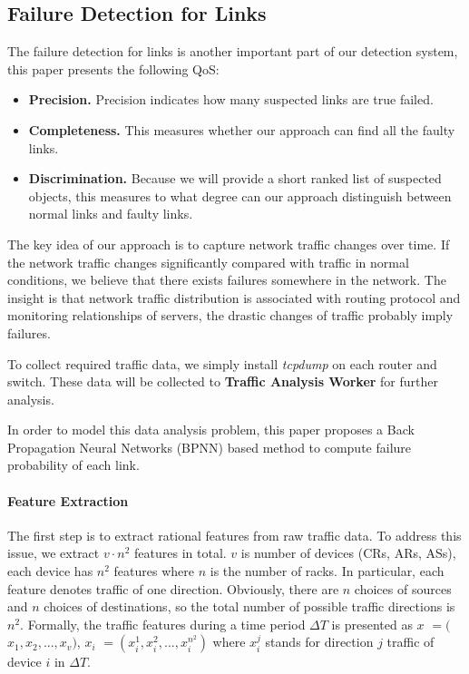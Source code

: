 \documentclass{sig-alternate-05-2015}
\begin{document}
\subsection{Failure Detection for Links}
The failure detection for links is another important part of our detection system, this paper presents the following QoS:
\begin{itemize}
  \item \textbf{Precision.} Precision indicates how many suspected links are true failed.
  \item \textbf{Completeness.} This measures whether our approach can find all the faulty links.
  \item \textbf{Discrimination.} Because we will provide a short ranked list of suspected objects, this measures to what degree can our approach distinguish between normal links and faulty links.
\end{itemize}

The key idea of our approach is to capture network traffic changes over time. If the network traffic changes significantly compared with traffic in normal conditions, we believe that there exists failures somewhere in the network. The insight is that network traffic distribution is associated with routing protocol and monitoring relationships of servers, the drastic changes of traffic probably imply failures.

To collect required traffic data, we simply install \textit{tcpdump} on each router and switch. These data will be collected to \textbf{Traffic Analysis Worker} for further analysis.

In order to model this data analysis problem, this paper proposes a Back Propagation Neural Networks (BPNN) based method to compute failure probability of each link.

\paragraph{Feature Extraction}
The first step is to extract rational features from raw traffic data. To address this issue, we extract $v \cdot n^2$ features in total. $v$ is number of devices (CRs, ARs, ASs), each device has $n^2$ features where $n$ is the number of racks. In particular, each feature denotes traffic of one direction. Obviously, there are $n$ choices of sources and $n$ choices of destinations, so the total number of possible traffic directions is $n^2$.
Formally, the traffic features during a time period $\Delta T$ is presented as \boldmath $x$
\unboldmath $=($\boldmath $x_1, x_2, ..., x_v$\unboldmath $)$, \boldmath $x_i$
\unboldmath $=(x_i^1, x_i^2, ..., x_i^{n^2})$
where $x_i^j$ stands for direction $j$ traffic of device $i$ in $\Delta T$.
\end{document}
